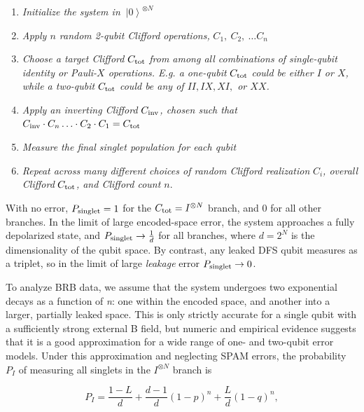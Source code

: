\documentclass[aps,prl,twocolumn,superscriptaddress,nobibnotes,10pt,floatfix]{revtex4-2}
\newcommand{\ts}[2]{{#1}_{\textnormal{#2}}}
\begin{document}
\begin{enumerate}
\def\labelenumi{\arabic{enumi}.}
\item
\emph{Initialize the system in}
\(\left.
\ |0 \right\rangle^{\otimes N}\)
\item
\emph{Apply $n$ random 2-qubit Clifford operations,}
\(C_{1},\ C_{2},\ \ldots C_{n}\)
\item
\emph{Choose a target Clifford} \(\ts{C}{tot}\) \emph{from among all
	combinations of single-qubit identity or Pauli-$X$ operations.
	E.g.
	a
	one-qubit} \(\ts{C}{tot}\) \emph{could be either $I$ or $X$, while a
	two-qubit} \(\ts{C}{tot}\) \emph{could be any of $II, IX, XI,$ or $XX$.}
\item
\emph{Apply an inverting Clifford} \(\ts{C}{inv}\)\emph{, chosen such
	that} \(\ts{C}{inv} \cdot C_{n}\ldots \cdot C_{2} \cdot C_{1} = \ts{C}{tot}\)
\item
\emph{Measure the final singlet population for each qubit}
\item
\emph{Repeat across many different choices of random Clifford
	realization} \(C_{i}\)\emph{, overall Clifford} \(\ts{C}{tot}\)\emph{, and
	Clifford count $n$}.
	\end{enumerate}

	With no error, \(\ts{P}{singlet} = 1\) for the \(\ts{C}{tot} = I^{\otimes N}\) branch, and 0 for all other branches.
	In the limit of large encoded-space error, the system approaches a fully depolarized state, and \(\ts{P}{singlet} \rightarrow \frac{1}{d}\) for all branches, where \(d = 2^{N}\) is the dimensionality of the qubit space.
	By contrast, any leaked DFS qubit measures as a triplet, so in the limit of large \emph{leakage} error \(\ts{P}{singlet} \rightarrow 0\).

	To analyze BRB data, we assume that the system undergoes two exponential decays as a function of \emph{n}: one within the encoded space, and another into a larger, partially leaked space.
	This is only strictly accurate for a single qubit with a sufficiently strong external B field, but numeric and empirical evidence suggests that it is a good approximation for a wide range of one- and two-qubit error models.
	Under this approximation and neglecting SPAM errors, the probability \(P_{I}\) of measuring all singlets in the \(I^{\otimes N}\) branch is

	\begin{equation}
P_{I} = \frac{1 - L}{d} + \frac{d - 1}{d}(1 - p)^{n} + \frac{L}{d}(1 - q)^{n},
\end{equation}
\end{document}
